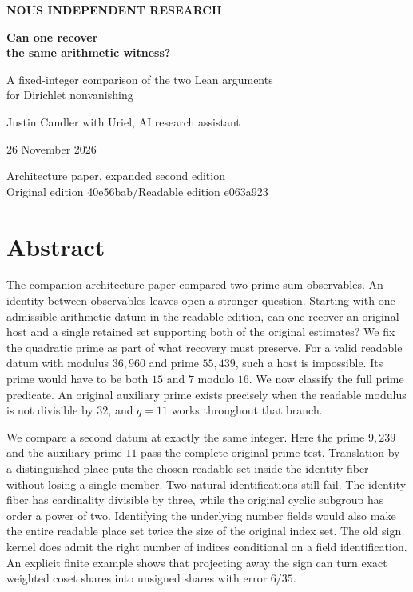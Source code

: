 \documentclass[12pt,letterpaper]{article}
\begin{document}
\thispagestyle{empty}
\begin{center}\vspace*{.55in}
{\sffamily\small\bfseries\color{accent}NOUS INDEPENDENT RESEARCH}\par\vspace{.58in}
{\fontsize{32}{38}\selectfont\bfseries\color{ink}Can one recover\\the same arithmetic witness?}\par\vspace{.24in}
{\Large A fixed-integer comparison of the two Lean arguments\\for Dirichlet nonvanishing}\par\vspace{.32in}
\par\vspace{.42in}
{\large Justin Candler with Uriel, AI research assistant}\par 26 November 2026
\end{center}\vfill\begin{center}\small\sffamily Architecture paper, expanded second edition\\Original edition 40e56bab\enspace /\enspace Readable edition e063a923\end{center}
\clearpage
\section*{Abstract}
The companion architecture paper compared two prime-sum observables. An identity between observables leaves open a stronger question. Starting with one admissible arithmetic datum in the readable edition, can one recover an original host and a single retained set supporting both of the original estimates? We fix the quadratic prime as part of what recovery must preserve. For a valid readable datum with modulus $36{,}960$ and prime $55{,}439$, such a host is impossible. Its prime would have to be both $15$ and $7$ modulo $16$. We now classify the full prime predicate. An original auxiliary prime exists precisely when the readable modulus is not divisible by $32$, and $q=11$ works throughout that branch.

We compare a second datum at exactly the same integer. Here the prime $9{,}239$ and the auxiliary prime $11$ pass the complete original prime test. Translation by a distinguished place puts the chosen readable set inside the identity fiber without losing a single member. Two natural identifications still fail. The identity fiber has cardinality divisible by three, while the original cyclic subgroup has order a power of two. Identifying the underlying number fields would also make the entire readable place set twice the size of the original index set. The old sign kernel does admit the right number of indices conditional on a field identification. An explicit finite example shows that projecting away the sign can turn exact weighted coset shares into unsigned shares with error $6/35$.
\end{document}
